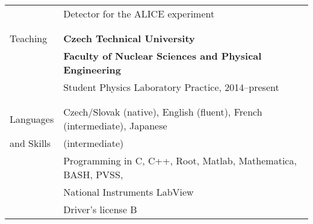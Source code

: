 \documentclass[a4paper,11pt,oneside]{article}
\begin{document}
\begin{tabular}{@{} l l}
     & Detector for the ALICE experiment \\
     \\
     \\
  \Large{Teaching}  & \textbf{Czech Technical University} \\
     & \textbf{Faculty of Nuclear Sciences and Physical Engineering} \\
     & Student Physics Laboratory Practice, 2014--present\\
     & \\
     \\
  \Large{Languages}   & Czech/Slovak (native), English (fluent), French (intermediate), Japanese \\
\Large{and Skills}    & (intermediate)  \\[.2cm]
     & Programming in C, C++, Root, Matlab, Mathematica, BASH, PVSS, \\
     &  National Instruments LabView \\[.2cm]
     & Driver's license B
\end{tabular}

\newpage
\end{document}
